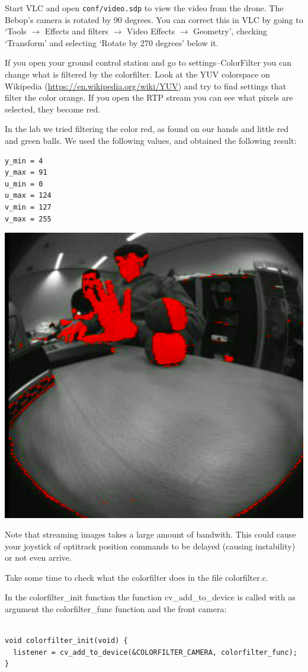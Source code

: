 \documentclass{article}
\begin{document}
Start VLC and open \verb|conf/video.sdp| to view the video from the drone.
The Bebop's camera is rotated by 90 degrees. You can correct this in VLC by going to `Tools $\rightarrow$ Effects and filters $\rightarrow$ Video Effects $\rightarrow$ Geometry', checking `Transform' and selecting `Rotate by 270 degrees' below it.
 
If you open your ground control station and go to settings--ColorFilter you can change what is filtered by the colorfilter. Look at the YUV colorspace on Wikipedia (\url{https://en.wikipedia.org/wiki/YUV}) and try to find settings that filter the color orange. If you open the RTP stream you can see what pixels are selected, they become red. 

In the lab we tried filtering the color red, as found on our hands and little red and green balls. We used the following values, and obtained the following result:
\begin{verbatim}
y_min = 4
y_max = 91
u_min = 0
u_max = 124
v_min = 127
v_max = 255
\end{verbatim}

\begin{center}
\centering
\includegraphics[width=0.75\linewidth]{filtered}
\end{center}

Note that streaming images takes a large amount of bandwith. This could cause your joystick of optitrack position commands to be delayed (causing instability) or not even arrive.

Take some time to check what the colorfilter does in the file colorfilter.c. 

In the colorfilter\_init function the function cv\_add\_to\_device is called with as argument the colorfilter\_func function and the front camera:
\begin{verbatim}

void colorfilter_init(void) {
  listener = cv_add_to_device(&COLORFILTER_CAMERA, colorfilter_func);
}

\end{verbatim}
\end{document}
